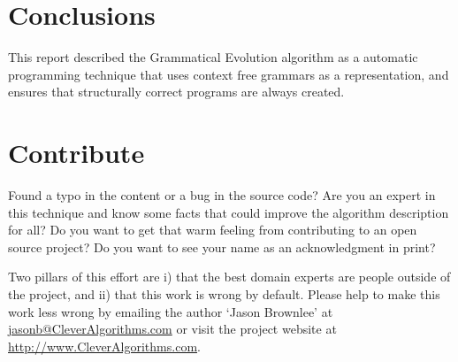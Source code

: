 \documentclass[a4paper, 11pt]{article}
\makeatletter
\newcommand{\myreportauthor}{Jason Brownlee}
\newcommand{\myreportemail}{jasonb@CleverAlgorithms.com}
\newcommand{\myreportwebsite}{http://www.CleverAlgorithms.com}
\makeatother
\begin{document}
% 
% 
\section{Conclusions}
\label{sec:conclusions}
This report described the Grammatical Evolution algorithm as a automatic programming technique that uses context free grammars as a representation, and ensures that structurally correct programs are always created.

% 
% 
\section{Contribute}
\label{sec:contribute}
Found a typo in the content or a bug in the source code? 
Are you an expert in this technique and know some facts that could improve the algorithm description for all?
Do you want to get that warm feeling from contributing to an open source project? 
Do you want to see your name as an acknowledgment in print?

Two pillars of this effort are i) that the best domain experts are people outside of the project, and ii) that this work is wrong by default. 
Please help to make this work less wrong by emailing the author `\myreportauthor' at \url{\myreportemail} or visit the project website at \url{\myreportwebsite}.



\end{document}
